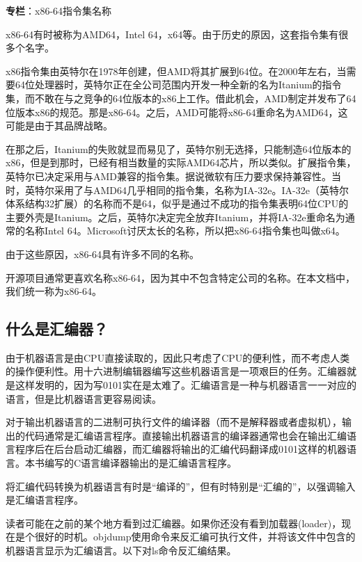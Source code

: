 \documentclass[cn,10pt,math=newtx,citestyle=gb7714-2015,bibstyle=gb7714-2015]{elegantbook}
\begin{document}
\begin{tcolorbox}
  \begin{tcolorbox}
\textbf{专栏}：x86-64指令集名称

x86-64有时被称为AMD64，Intel 64，x64等。由于历史的原因，这套指令集有很多个名字。

x86指令集由英特尔在1978年创建，但AMD将其扩展到64位。在2000年左右，当需要64位处理器时，英特尔正在全公司范围内开发一种全新的名为Itanium的指令集，而不敢在与之竞争的64位版本的x86上工作。借此机会，AMD制定并发布了64位版本x86的规范。那是x86-64。之后，AMD可能将x86-64重命名为AMD64，这可能是由于其品牌战略。

在那之后，Itanium的失败就显而易见了，英特尔别无选择，只能制造64位版本的x86，但是到那时，已经有相当数量的实际AMD64芯片，所以类似。扩展指令集，英特尔已决定采用与AMD兼容的指令集。据说微软有压力要求保持兼容性。当时，英特尔采用了与AMD64几乎相同的指令集，名称为IA-32e。IA-32e（英特尔体系结构32扩展）的名称而不是64，似乎是通过不成功的指令集表明64位CPU的主要外壳是Itanium。之后，英特尔决定完全放弃Itanium，并将IA-32e重命名为通常的名称Intel 64。Microsoft讨厌太长的名称，所以把x86-64指令集也叫做x64。

由于这些原因，x86-64具有许多不同的名称。

开源项目通常更喜欢名称x86-64，因为其中不包含特定公司的名称。在本文档中，我们统一称为x86-64。
  \end{tcolorbox}
\end{tcolorbox}

\subsection{什么是汇编器？}

由于机器语言是由CPU直接读取的，因此只考虑了CPU的便利性，而不考虑人类的操作便利性。用十六进制编辑器编写这些机器语言是一项艰巨的任务。汇编器就是这样发明的，因为写0101实在是太难了。汇编语言是一种与机器语言一一对应的语言，但是比机器语言更容易阅读。

对于输出机器语言的二进制可执行文件的编译器（而不是解释器或者虚拟机），输出的代码通常是汇编语言程序。直接输出机器语言的编译器通常也会在输出汇编语言程序后在后台启动汇编器，而汇编器将输出的汇编代码翻译成0101这样的机器语言。本书编写的C语言编译器输出的是汇编语言程序。

将汇编代码转换为机器语言有时是“编译的”，但有时特别是“汇编的”，以强调输入是汇编语言程序。

读者可能在之前的某个地方看到过汇编器。如果你还没有看到加载器(loader)，现在是个很好的时机。objdump使用命令来反汇编可执行文件，并将该文件中包含的机器语言显示为汇编语言。以下对ls命令反汇编结果。
\end{document}

